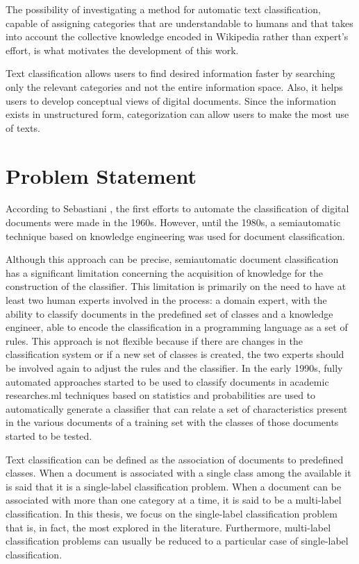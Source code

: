 The possibility of investigating a method for automatic text classification, capable of assigning categories that are understandable to humans and that takes into account the collective knowledge encoded in Wikipedia rather than expert's effort, is what motivates the development of this work.

Text classification allows users to find desired information faster by searching only the relevant categories and not the entire information space. Also, it helps users to develop conceptual views of digital documents. Since the information exists in unstructured form, categorization can allow users to make the most use of texts. 




\section{\hspace*{3pt}Problem Statement}


According to Sebastiani \cite{Sebastiani:2002}, the first efforts to automate the classification of digital documents were made in the 1960s. However, until the 1980s, a semiautomatic technique based on knowledge engineering was used for document classification.

Although this approach can be precise, semiautomatic document classification has a significant limitation concerning the acquisition of knowledge for the construction of the classifier. This limitation is primarily on the need to have at least two human experts involved in the process: a domain expert, with the ability to classify documents in the predefined set of classes and a knowledge engineer, able to encode the classification in a programming language as a set of rules. This approach is not flexible because if there are changes in the classification system or if a new set of classes is created, the two experts should be involved again to adjust the rules and the classifier.
In the early 1990s, fully automated approaches started to be used to classify documents in academic researches.\gls{ml} techniques based on statistics and probabilities are used to automatically generate a classifier that can relate a set of characteristics present in the various documents of a training set with the classes of those documents started to be tested.


Text classification can be defined as the association of documents to predefined classes. When a document is associated with a single class among the available it is said that it is a single-label classification problem. When a document can be associated with more than one category at a time, it is said to be a multi-label classification. In this thesis, we focus on the single-label classification problem that is, in fact, the most explored in the literature. Furthermore, multi-label classification problems can usually be reduced to a particular case of single-label classification.


